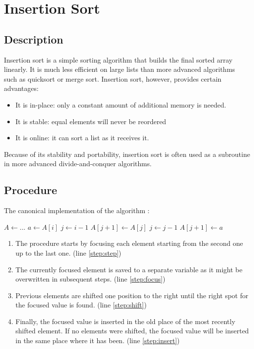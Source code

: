 \documentclass[titlepage, a4paper, 12pt]{article}
\begin{document}
    \clearpage
    \section{Insertion Sort}

    \subsection{Description}

    Insertion sort is a simple sorting algorithm that builds the final sorted array linearly. It is much less efficient on large lists than more advanced algorithms such as quicksort or merge sort. Insertion sort, however, provides certain advantages:

    \begin{itemize}
        \item It is in-place: only a constant amount of additional memory is needed.
        \item It is stable: equal elements will never be reordered
        \item It is online: it can sort a list as it receives it.
    \end{itemize}

    Because of its stability and portability, insertion sort is often used as a subroutine in more advanced divide-and-conquer algorithms.

    \subsection{Procedure}

    The canonical implementation of the algorithm \cite{cormen}:

    \begin{algorithmic}[1]
        \State $A \gets ...$
         \label{step:step}
            \State $a \gets A[i]$ \label{step:focus}
            \State $j \gets i - 1$
             \label{step:shift}
                \State $A[j + 1] \gets A[j]$
                \State $j \gets j - 1$
            \EndWhile
            \State $A[j + 1] \gets a$ \label{step:insert}
        \EndFor
    \end{algorithmic}

    \begin{enumerate}
        \item The procedure starts by focusing each element starting from the second one up to the last one. (line \ref{step:step})
        \item The currently focused element is saved to a separate variable as it might be overwritten in subsequent steps. (line \ref{step:focus})
        \item Previous elements are shifted one position to the right until the right spot for the focused value is found. (line \ref{step:shift})
        \item Finally, the focused value is inserted in the old place of the most recently shifted element. If no elements were shifted, the focused value will be inserted in the same place where it has been. (line \ref{step:insert})
    \end{enumerate}
\end{document}
